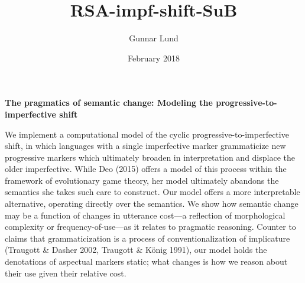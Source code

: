 \documentclass[12pt]{article}
\title{RSA-impf-shift-SuB}
\author{Gunnar Lund}
\date{February 2018}
\begin{document}


\begin{center}
\textbf{The pragmatics of semantic change: Modeling the progressive-to-imperfective shift}
\end{center}

\vspace{-5pt}
\noindent We implement a computational model of the cyclic progressive-to-imperfective shift, in which languages with a single imperfective marker grammaticize new progressive markers which ultimately broaden in interpretation and displace the older imperfective.  %
While Deo (2015) offers a model of this process within the framework of evolutionary game theory, her model ultimately abandons the semantics she takes such care to construct. Our model offers a more interpretable alternative, operating directly over the semantics.  We show how semantic change may be a function of changes in utterance cost---a reflection of morphological complexity or frequency-of-use---as it relates to pragmatic reasoning. Counter to claims that grammaticization is a process of conventionalization of implicature (Traugott \& Dasher 2002, Traugott \& K\"{o}nig 1991), our model holds the denotations of aspectual markers static; what changes is how we reason about their use given their relative cost. %
\end{document}
